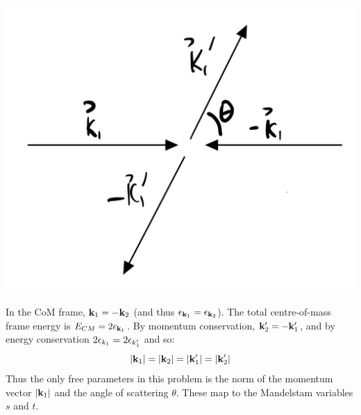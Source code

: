 \begin{center}
    \includegraphics[scale=0.35]{Lectures/Figures/lec18-scatter.png}
\end{center}

In the CoM frame, $\mathbf{k}_1 = -\mathbf{k}_2$ (and thus $\epsilon_{\mathbf{k}_1} = \epsilon_{\mathbf{k}_2}$). The total centre-of-mass frame energy is $E_{CM} = 2\epsilon_{\mathbf{k}_1}$. By momentum conservation, $\mathbf{k}_2' = -\mathbf{k}_1'$, and by energy conservation $2\epsilon_{k_1} = 2\epsilon_{k_1'}$ and so:
\begin{equation}
    \lvert \mathbf{k}_1 \rvert = \lvert \mathbf{k}_2 \rvert = \lvert \mathbf{k}_1' \rvert = \lvert \mathbf{k}_2' \rvert
\end{equation}
Thus the only free parameters in this problem is the norm of the momentum vector $\lvert \mathbf{k}_1 \rvert$ and the angle of scattering $\theta$. These map to the Mandelstam variables $s$ and $t$. 

